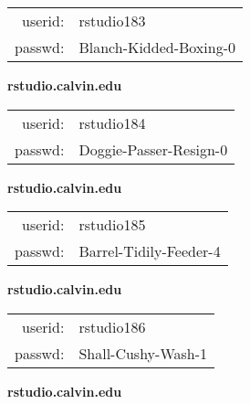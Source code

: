 \documentclass{article}\usepackage[]{graphicx}\usepackage[]{color}
\begin{document}
\begin{multicols}{3}
\begin{minipage}{.3\textwidth}
\begin{tabular}{rl}
userid: & rstudio183\\
passwd: & Blanch-Kidded-Boxing-0

\vspace{5mm}

\end{tabular}\end{minipage}

\vspace{5mm}

\begin{minipage}{.3\textwidth}
\centerline{\textbf{rstudio.calvin.edu}}
\medskip
\begin{tabular}{rl}

userid: & rstudio184\\
passwd: & Doggie-Passer-Resign-0

\vspace{5mm}

\end{tabular}\end{minipage}

\vspace{5mm}

\begin{minipage}{.3\textwidth}
\centerline{\textbf{rstudio.calvin.edu}}
\medskip
\begin{tabular}{rl}

userid: & rstudio185\\
passwd: & Barrel-Tidily-Feeder-4

\vspace{5mm}

\end{tabular}\end{minipage}

\vspace{5mm}

\begin{minipage}{.3\textwidth}
\centerline{\textbf{rstudio.calvin.edu}}
\medskip
\begin{tabular}{rl}

userid: & rstudio186\\
passwd: & Shall-Cushy-Wash-1

\vspace{5mm}

\end{tabular}\end{minipage}

\vspace{5mm}

\begin{minipage}{.3\textwidth}
\centerline{\textbf{rstudio.calvin.edu}}
\medskip
\begin{tabular}{rl}


\end{tabular}
\end{minipage}
\end{multicols}
\end{document}
